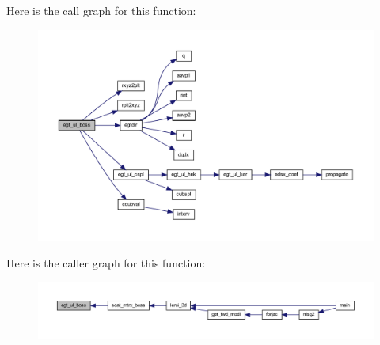Here is the call graph for this function\+:\nopagebreak
\begin{figure}[H]
\begin{center}
\leavevmode
\includegraphics[width=350pt]{Leroi_8f90_a9074cfabdfb82294ca3b8541c14a9099_cgraph}
\end{center}
\end{figure}
Here is the caller graph for this function\+:\nopagebreak
\begin{figure}[H]
\begin{center}
\leavevmode
\includegraphics[width=350pt]{Leroi_8f90_a9074cfabdfb82294ca3b8541c14a9099_icgraph}
\end{center}
\end{figure}
\mbox{\label{Leroi_8f90_a55b57146ea180fed3080a010421620fe}} 
